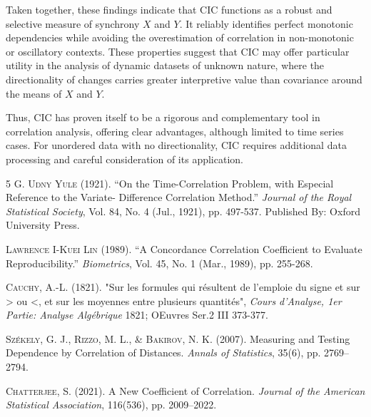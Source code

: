 \documentclass[aos]{imsart}
\newcommand{\cic}{\text{CIC}}
\begin{document}
Taken together, these findings indicate that $\cic$ functions as a robust and selective measure of synchrony $X$ and $Y$. It reliably identifies perfect monotonic dependencies while avoiding the overestimation of correlation in non-monotonic or oscillatory contexts. These properties suggest that $\cic$ may offer particular utility in the analysis of dynamic datasets of unknown nature, where the directionality of changes carries greater interpretive value than covariance around the means of $X$ and $Y$.

Thus, $\cic$ has proven itself to be a rigorous and complementary tool in correlation analysis, offering clear advantages, although limited to time series cases. For unordered data with no directionality, $\cic$ requires additional data processing and careful consideration of its application.


\begin{thebibliography}{5}
\textsc{G. Udny Yule} (1921). “On the Time-Correlation Problem, with Especial Reference to the Variate- Difference Correlation Method.” \textit{Journal of the Royal Statistical Society}, Vol. 84, No. 4 (Jul., 1921), pp. 497-537. Published By: Oxford University Press.

\textsc{Lawrence I-Kuei Lin} (1989). “A Concordance Correlation Coefficient to Evaluate Reproducibility.” \textit{Biometrics}, Vol. 45, No. 1 (Mar., 1989), pp. 255-268.

\textsc{Cauchy, A.-L.} (1821). "Sur les formules qui résultent de l'emploie du signe et sur > ou <, et sur les moyennes entre plusieurs quantités", \textit{Cours d'Analyse, 1er Partie: Analyse Algébrique} 1821; OEuvres Ser.2 III 373-377.

\textsc{Székely, G. J., Rizzo, M. L., \& Bakirov, N. K.} (2007). Measuring and Testing Dependence by Correlation of Distances. \textit{Annals of Statistics}, 35(6), pp. 2769–2794.

\textsc{Chatterjee, S.} (2021). A New Coefficient of Correlation. \textit{Journal of the American Statistical Association}, 116(536), pp. 2009–2022.
\end{thebibliography}
\end{document}
